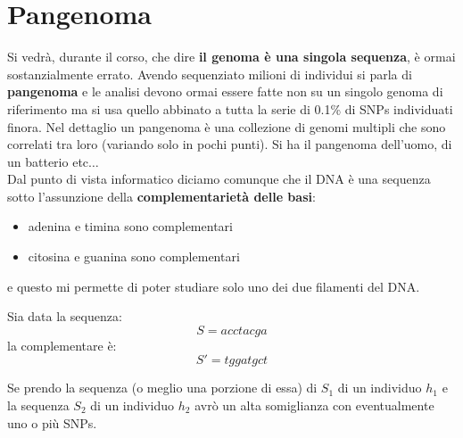 \documentclass[a4paper,12pt, oneside]{book}
\begin{document}
\section{Pangenoma}
Si vedrà, durante il corso, che dire \textbf{il genoma è una singola sequenza},
è ormai sostanzialmente errato. Avendo sequenziato milioni di individui si parla
di \textbf{pangenoma} e le analisi devono ormai essere fatte non su un singolo
genoma di riferimento ma si usa quello abbinato a tutta la serie di 0.1\% di
SNPs individuati finora.
Nel dettaglio un pangenoma è una collezione di genomi multipli che sono
correlati tra loro (variando solo in pochi punti). Si ha il pangenoma dell'uomo,
di un batterio etc$\ldots$\\
Dal punto di vista informatico diciamo comunque che il DNA è una sequenza sotto
l'assunzione della \textbf{complementarietà delle basi}:
\begin{itemize}
  \item adenina e timina sono complementari
  \item citosina e guanina sono complementari 
\end{itemize}
e questo mi permette di poter studiare solo uno dei due filamenti del DNA.
\begin{esempio}
  Sia data la sequenza:
  \[S=acctacga\]
  la complementare è:
  \[S'=tggatgct\]
\end{esempio}
Se prendo la sequenza (o meglio una porzione di essa) di $S_1$ di un individuo
$h_1$ e la sequenza $S_2$ di un individuo $h_2$ avrò un alta somiglianza con
eventualmente uno o più SNPs.
\end{document}
